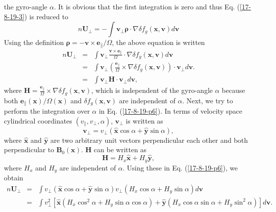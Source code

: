\documentclass{article}
\newcommand{\tmmathbf}[1]{\ensuremath{\boldsymbol{#1}}}
\begin{document}
the gyro-angle $\alpha$. It is obvious that the first integration is zero and
thus Eq. (\ref{17-8-19-3}) is reduced to
\begin{equation}
  n\mathbf{U}_{\perp} = - \int \mathbf{v}_{\perp} \tmmathbf{\rho} \cdot \nabla
  \delta f_g (\mathbf{x}, \mathbf{v}) d\mathbf{v}
\end{equation}
Using the definition $\tmmathbf{\rho}= -\mathbf{v} \times
\mathbf{e}_{\parallel} / \Omega$, the above equation is written
\begin{eqnarray}
  n\mathbf{U}_{\perp} & = & \int \mathbf{v}_{\perp} \frac{\mathbf{v} \times
  \mathbf{e}_{\parallel}}{\Omega} \cdot \nabla \delta f_g (\mathbf{x},
  \mathbf{v}) d\mathbf{v} \nonumber\\
  & = & \int \mathbf{v}_{\perp} \left( \frac{\mathbf{e}_{\parallel}}{\Omega}
  \times \nabla \delta f_g (\mathbf{x}, \mathbf{v}) \right) \cdot
  \mathbf{v}_{\perp} d\mathbf{v}. \nonumber\\
  & = & \int \mathbf{v}_{\perp} \mathbf{H} \cdot \mathbf{v}_{\perp}
  d\mathbf{v},  \label{17-8-19-p6}
\end{eqnarray}
where $\mathbf{H}= \frac{\mathbf{e}_{\parallel}}{\Omega} \times \nabla \delta
f_g (\mathbf{x}, \mathbf{v})$, which is independent of the gyro-angle $\alpha$
because both $\mathbf{e}_{\parallel} (\mathbf{x}) / \Omega (\mathbf{x})$ and
$\delta f_g (\mathbf{x}, \mathbf{v})$ are independent of $\alpha$. Next, we
try to perform the integration over $\alpha$ in Eq. (\ref{17-8-19-p6}). In
terms of velocity space cylindrical coordinates $(v_{\parallel}, v_{\perp},
\alpha)$, $\mathbf{v}_{\perp}$ is written as
\begin{equation}
  \mathbf{v}_{\perp} = v_{\perp} (\hat{\mathbf{x}} \cos \alpha +
  \hat{\mathbf{y}} \sin \alpha),
\end{equation}
where $\hat{\mathbf{x}}$ and $\hat{\mathbf{y}}$ are two arbitrary unit vectors
perpendicular each other and both perpendicular to $\mathbf{B}_0
(\mathbf{x})$. $\mathbf{H}$ can be written as
\begin{equation}
  \mathbf{H}= H_x \hat{\mathbf{x}} + H_y \hat{\mathbf{y}},
\end{equation}
where $H_x$ and $H_y$ are independent of $\alpha$. Using these in Eq.
(\ref{17-8-19-p6}), we obtain
\begin{eqnarray}
  n\mathbf{U}_{\perp} & = & \int v_{\perp} (\hat{\mathbf{x}} \cos \alpha +
  \hat{\mathbf{y}} \sin \alpha) v_{\perp} (H_x \cos \alpha + H_y \sin \alpha)
  d\mathbf{v} \nonumber\\
  & = & \int v_{\perp}^2 [\hat{\mathbf{x}} (H_x \cos^2 \alpha + H_y \sin
  \alpha \cos \alpha) + \hat{\mathbf{y}} (H_x \cos \alpha \sin \alpha + H_y
  \sin^2 \alpha)] d\mathbf{v}. 
\end{eqnarray}
\end{document}
